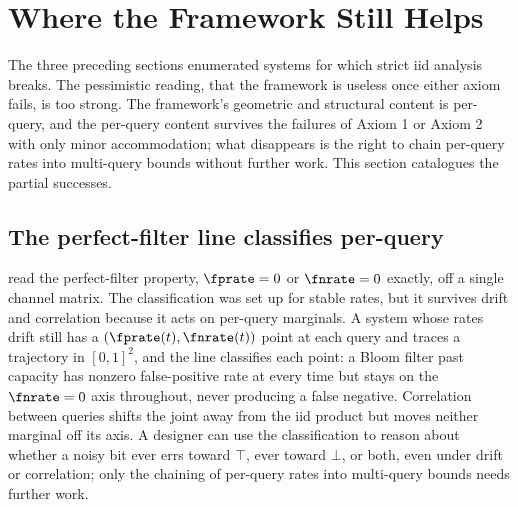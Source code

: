 %

\section{Where the Framework Still Helps}
\label{sec:where-framework-helps}

The three preceding sections enumerated systems for which strict iid
analysis breaks. The pessimistic reading, that the framework is useless
once either axiom fails, is too strong. The framework's geometric and
structural content is per-query, and the per-query content survives the
failures of Axiom 1 or Axiom 2 with only minor accommodation; what
disappears is the right to chain per-query rates into multi-query bounds
without further work. This section catalogues the partial successes.

\subsection*{The perfect-filter line classifies per-query}

 read the perfect-filter property,
$\fprate = 0$ or $\fnrate = 0$ exactly, off a single channel matrix. The
classification was set up for stable rates, but it survives drift and
correlation because it acts on per-query marginals. A system whose rates
drift still has a $(\fprate(t), \fnrate(t))$ point at each query and
traces a trajectory in $[0,1]^2$, and the line classifies each point: a
Bloom filter past capacity has nonzero false-positive rate at every time
but stays on the $\fnrate = 0$ axis throughout, never producing a false
negative. Correlation between queries shifts the joint away from the iid
product but moves neither marginal off its axis. A designer can use the
classification to reason about whether a noisy bit ever errs toward
$\top$, ever toward $\bot$, or both, even under drift or correlation; only
the chaining of per-query rates into multi-query bounds needs further
work.

